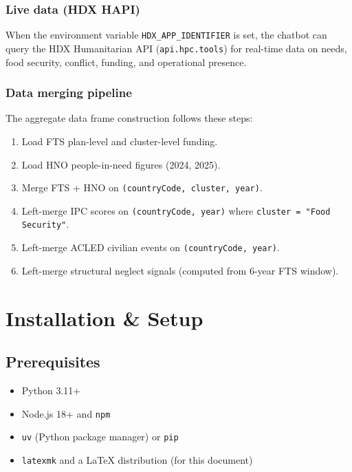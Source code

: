 \documentclass[11pt,a4paper]{article}
\newcommand{\code}[1]{\texttt{#1}}
\begin{document}
\subsubsection{Live data (HDX HAPI)}

When the environment variable \code{HDX\_APP\_IDENTIFIER} is set, the chatbot
can query the HDX Humanitarian API (\texttt{api.hpc.tools}) for real-time data
on needs, food security, conflict, funding, and operational presence.

\subsubsection{Data merging pipeline}

The aggregate data frame construction follows these steps:

\begin{enumerate}[nosep]
  \item Load FTS plan-level and cluster-level funding.
  \item Load HNO people-in-need figures (2024, 2025).
  \item Merge FTS + HNO on \texttt{(countryCode, cluster, year)}.
  \item Left-merge IPC scores on \texttt{(countryCode, year)} where
        \texttt{cluster = "Food Security"}.
  \item Left-merge ACLED civilian events on \texttt{(countryCode, year)}.
  \item Left-merge structural neglect signals (computed from 6-year FTS window).
\end{enumerate}

\section{Installation \& Setup}

\subsection{Prerequisites}

\begin{itemize}[nosep]
  \item Python 3.11+
  \item Node.js 18+ and \code{npm}
  \item \code{uv} (Python package manager) or \code{pip}
  \item \code{latexmk} and a \LaTeX{} distribution (for this document)
\end{itemize}
\end{document}
